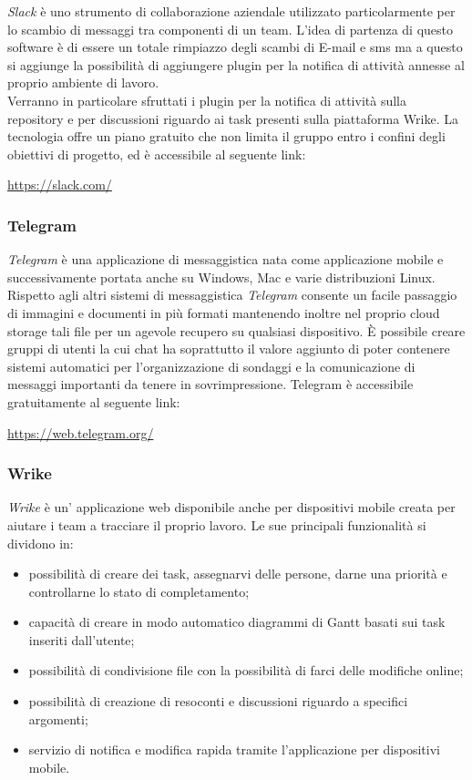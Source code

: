 \documentclass[../NormediProgetto.tex]{subfiles}
\begin{document}
	\textit{Slack} è uno strumento di collaborazione aziendale utilizzato particolarmente per lo scambio di messaggi tra componenti di un team. L'idea di partenza di questo software è di essere un totale rimpiazzo degli scambi di E-mail e sms ma a questo si aggiunge la possibilità di aggiungere plugin per la notifica di attività annesse al proprio ambiente di lavoro.
	\\ \noindent Verranno in particolare sfruttati i plugin per la notifica di attività sulla repository e per discussioni riguardo ai task presenti sulla piattaforma Wrike. La tecnologia offre un piano gratuito che non limita il gruppo entro i confini degli obiettivi di progetto, ed è accessibile al seguente link:
	\begin{center}
		\url{https://slack.com/}
	\end{center}
	
	\subsubsection{Telegram}
	
	\textit{Telegram} è una applicazione di messaggistica nata come applicazione mobile e successivamente portata anche su Windows, Mac e varie distribuzioni Linux. Rispetto agli altri sistemi di messaggistica \textit{Telegram} consente un facile passaggio di immagini e documenti in più formati mantenendo inoltre nel proprio cloud storage tali file per un agevole recupero su qualsiasi dispositivo. È possibile creare gruppi di utenti la cui chat ha soprattutto il valore aggiunto di poter contenere sistemi automatici per l'organizzazione di sondaggi e la comunicazione di messaggi importanti da tenere in sovrimpressione. Telegram è accessibile gratuitamente al seguente link:
	\begin{center}
		\url{https://web.telegram.org/}
	\end{center}
	
	\subsubsection{Wrike}
	
	\textit{Wrike} è un' applicazione web disponibile anche per dispositivi mobile creata per aiutare i team a tracciare il proprio lavoro. Le sue principali funzionalità si dividono in:
	\begin{itemize}
		\item possibilità di creare dei task, assegnarvi delle persone, darne una priorità e controllarne lo stato di completamento;
		\item capacità di creare in modo automatico diagrammi di Gantt basati sui task inseriti dall'utente;
		\item possibilità di condivisione file con la possibilità di farci delle modifiche online;
		\item possibilità di creazione di resoconti e discussioni riguardo a specifici argomenti;
		\item servizio di notifica e modifica rapida tramite l'applicazione per dispositivi mobile.
	\end{itemize}
	
\end{document}
